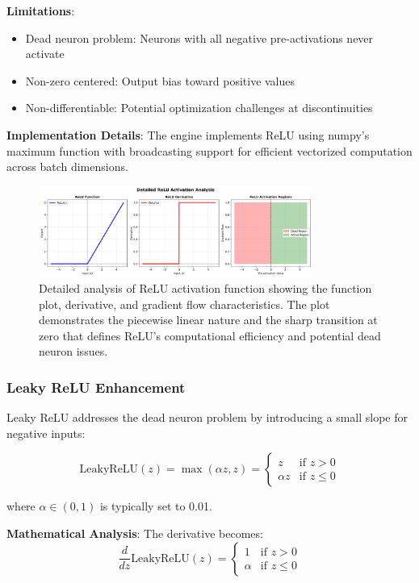 \documentclass[11pt,a4paper]{report}
\begin{document}
\textbf{Limitations}:
\begin{itemize}
\item Dead neuron problem: Neurons with all negative pre-activations never activate
\item Non-zero centered: Output bias toward positive values
\item Non-differentiable: Potential optimization challenges at discontinuities
\end{itemize}

\textbf{Implementation Details}: The engine implements ReLU using numpy's maximum function with broadcasting support for efficient vectorized computation across batch dimensions.

\begin{figure}[H]
\centering
\includegraphics[width=0.8\textwidth]{activation_relu_detailed.png}
\caption{Detailed analysis of ReLU activation function showing the function plot, derivative, and gradient flow characteristics. The plot demonstrates the piecewise linear nature and the sharp transition at zero that defines ReLU's computational efficiency and potential dead neuron issues.}
\label{fig:activation_relu}
\end{figure}

\subsubsection{Leaky ReLU Enhancement}

Leaky ReLU addresses the dead neuron problem by introducing a small slope for negative inputs:

\begin{equation}
\text{LeakyReLU}(z) = \max(\alpha z, z) = \begin{cases}
z & \text{if } z > 0 \\
\alpha z & \text{if } z \leq 0
\end{cases}
\end{equation}

where $\alpha \in (0, 1)$ is typically set to 0.01.

\textbf{Mathematical Analysis}: The derivative becomes:
\begin{equation}
\frac{d}{dz}\text{LeakyReLU}(z) = \begin{cases}
1 & \text{if } z > 0 \\
\alpha & \text{if } z \leq 0
\end{cases}
\end{equation}
\end{document}
